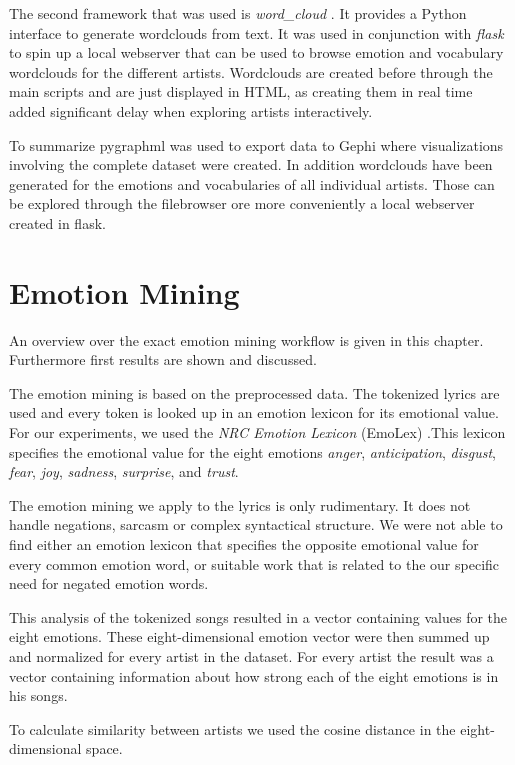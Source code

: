 \documentclass[10pt,a4paper]{article}
\begin{document}
	The second framework that was used is \textit{word\_cloud} \cite{wordcloud}. It provides a Python interface to generate wordclouds from text. It was used in conjunction with \textit{flask} \cite{flask} to spin up a local webserver that can be used to browse emotion and vocabulary wordclouds for the different artists. Wordclouds are created before through the main scripts and are just displayed in HTML, as creating them in real time added significant delay when exploring artists interactively.
	
	To summarize pygraphml was used to export data to Gephi where visualizations involving the complete dataset were created. In addition wordclouds have been generated for the emotions and vocabularies of all individual artists. Those can be explored through the filebrowser ore more conveniently a local webserver created in flask.
	
	\section{Emotion Mining}
	\label{sec:emotionmining}
	An overview over the exact emotion mining workflow is given in this chapter. Furthermore first results are shown and discussed.
	
	The emotion mining is based on the preprocessed data. The tokenized lyrics are used and every token is looked up in an emotion lexicon for its emotional value. For our experiments, we used the \textit{NRC Emotion Lexicon} (EmoLex) \cite{emolex}.This lexicon specifies the emotional value for the eight emotions \textit{anger}, \textit{anticipation}, \textit{disgust}, \textit{fear}, \textit{joy}, \textit{sadness}, \textit{surprise}, and \textit{trust}.
	
	The emotion mining we apply to the lyrics is only rudimentary. It does not handle negations, sarcasm or complex syntactical structure. We were not able to find either an emotion lexicon that specifies the opposite emotional value for every common emotion word, or suitable work that is related to the our specific need for negated emotion words.
	
	This analysis of the tokenized songs resulted in a vector containing values for the eight emotions. These eight-dimensional emotion vector were then summed up and normalized for every artist in the dataset. For every artist the result was a vector containing information about how strong each of the eight emotions is in his songs.
	
	To calculate similarity between artists we used the cosine distance in the eight-dimensional space.
	
\end{document}
